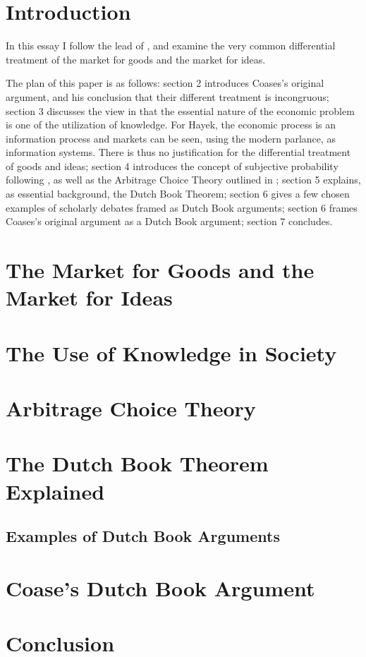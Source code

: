 \documentclass[11pt,]{article}
\begin{document}
\section{Introduction}\label{introduction}

In this essay I follow the lead of \citet{Coase1974}, and examine the
very common differential treatment of the market for goods and the
market for ideas.

The plan of this paper is as follows: section 2 introduces Coases's
original argument, and his conclusion that their different treatment is
incongruous; section 3 discusses the view in \citet{Hayek1945} that the
essential nature of the economic problem is one of the utilization of
knowledge. For Hayek, the economic process is an information process and
markets can be seen, using the modern parlance, as information systems.
There is thus no justification for the differential treatment of goods
and ideas; section 4 introduces the concept of subjective probability
following \citet{deFinetti1937}, as well as the Arbitrage Choice Theory
outlined in \citet{Nau1999}; section 5 explains, as essential
background, the Dutch Book Theorem; section 6 gives a few chosen
examples of scholarly debates framed as Dutch Book arguments; section 6
frames Coases's original argument as a Dutch Book argument; section 7
concludes.

\section{The Market for Goods and the Market for
Ideas}\label{the-market-for-goods-and-the-market-for-ideas}

\section{The Use of Knowledge in
Society}\label{the-use-of-knowledge-in-society}

\section{Arbitrage Choice Theory}\label{arbitrage-choice-theory}

\section{The Dutch Book Theorem
Explained}\label{the-dutch-book-theorem-explained}

\subsection{Examples of Dutch Book
Arguments}\label{examples-of-dutch-book-arguments}

\section{Coase's Dutch Book Argument}\label{coases-dutch-book-argument}

\section{Conclusion}\label{conclusion}

\newpage
\singlespacing 

\end{document}

